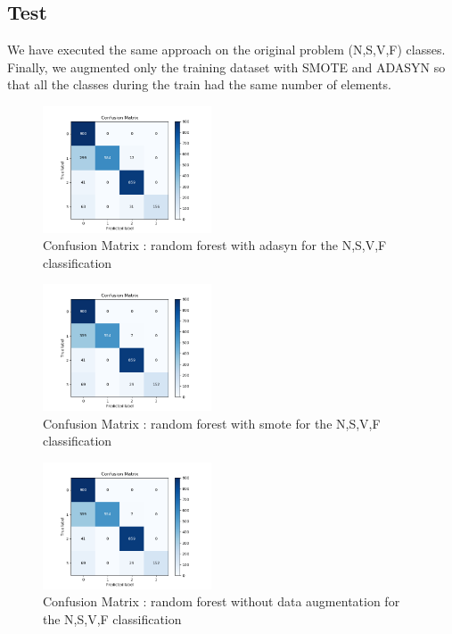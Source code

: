 \documentclass[LaM,binding=0.6cm]{sapthesis}
\begin{document}
\subsection{Test}
We have executed the same approach on the original problem (N,S,V,F) classes.\\Finally, we augmented only the training dataset with SMOTE and ADASYN so that all the classes during the train had the same number of elements.
\begin{figure}[H]
	\includegraphics[width=50mm,scale=0.7]{confusion-matrixdwt-random-forest-paper-smote-smaller-test-adasyn.png}
	\caption{Confusion Matrix : random forest with adasyn for the N,S,V,F classification}
	\label{fig: rf3  }
\end{figure}
\begin{figure}[H]
	\includegraphics[width=50mm,scale=0.7]{confusion-matrixdwt-random-forest-paper-smote-smaller-test.png}
	\caption{Confusion Matrix : random forest with smote for the N,S,V,F classification}
	\label{fig: rf4  }
\end{figure}
\begin{figure}[H]
	\includegraphics[width=50mm,scale=0.7]{confusion-matrixdwt-random-forest-paper-smote-smaller-no-data-aug.png}
	\caption{Confusion Matrix : random forest without data augmentation for the N,S,V,F classification}
	\label{fig: rf3  }
\end{figure}
\end{document}
